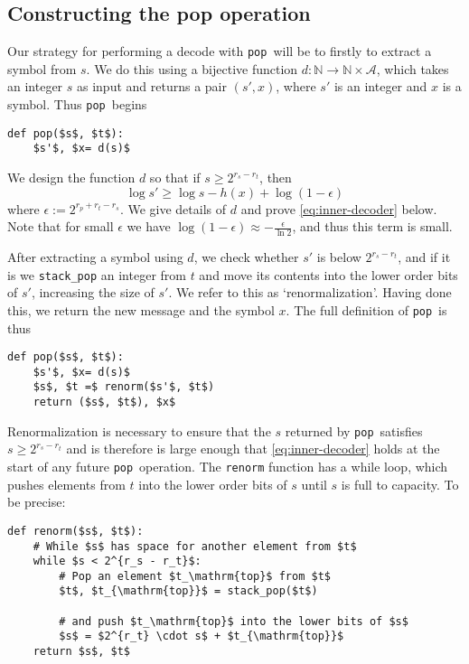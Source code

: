 \documentclass{article}
\newcommand{\pop}{\texttt{pop}}
\begin{document}
\subsection{Constructing the pop operation}
Our strategy for performing a decode with \pop\ will be to firstly to extract a
symbol from $s$. We do this using a bijective function $d:\mathbb
N\rightarrow\mathbb N\times\mathcal{A}$, which takes an integer $s$ as input
and returns a pair $(s', x)$, where $s'$ is an integer and $x$ is a symbol.
Thus \pop\ begins
\begin{lstlisting}
def pop($s$, $t$):
    $s'$, $x= d(s)$
\end{lstlisting}
We design the function $d$ so that if $s\geq 2^{r_s - r_t}$, then
\begin{equation}\label{eq:inner-decoder}
  \log s'\geq\log s - h(x) + \log (1 - \epsilon)
\end{equation}
where $\epsilon := 2^{r_p + r_t - r_s}$. We give details of $d$ and prove
\cref{eq:inner-decoder} below. Note that for small $\epsilon$ we have $\log (1
- \epsilon) \approx -\frac{\epsilon}{\ln2}$, and thus this term is small.

After extracting a symbol using $d$, we check whether $s'$ is below $2^{r_s -
r_t}$, and if it is we \texttt{stack\_pop} an integer from $t$ and move its
contents into the lower order bits of $s'$, increasing the size of $s'$. We
refer to this as `renormalization'. Having done this, we return the new message
and the symbol $x$. The full definition of \pop\ is thus
\begin{lstlisting}
def pop($s$, $t$):
    $s'$, $x= d(s)$
    $s$, $t =$ renorm($s'$, $t$)
    return ($s$, $t$), $x$
\end{lstlisting}

Renormalization is necessary to ensure that the $s$ returned by \pop\ satisfies
$s\geq2^{r_s - r_t}$ and is therefore is large enough that
\cref{eq:inner-decoder} holds at the start of any future \pop\ operation. The
\texttt{renorm} function has a while loop, which pushes elements from $t$ into
the lower order bits of $s$ until $s$ is full to capacity. To be precise:

\begin{lstlisting}
def renorm($s$, $t$):
    # While $s$ has space for another element from $t$
    while $s < 2^{r_s - r_t}$:
        # Pop an element $t_\mathrm{top}$ from $t$
        $t$, $t_{\mathrm{top}}$ = stack_pop($t$)

        # and push $t_\mathrm{top}$ into the lower bits of $s$
        $s$ = $2^{r_t} \cdot s$ + $t_{\mathrm{top}}$
    return $s$, $t$
\end{lstlisting}
\end{document}
